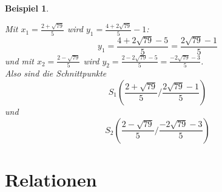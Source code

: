 \documentclass{report}
\newtheorem{myexample}{Beispiel}
\begin{document}
\begin{myexample}
\begin{enumerate}
\begin{enumerate}
Mit $x_1 = \frac{2 + \sqrt{79}}{5}$ wird $y_1 = \frac{4 + 2 \sqrt{79}}{5}-1$:
\begin{equation}y_1 = \frac{4 + 2 \sqrt{79} -5}{5} = \frac{2 \sqrt{79} -1}{5}\end{equation}
und mit $x_2 = \frac{2 - \sqrt{79}}{5}$ wird $y_2 = \frac{2-2\sqrt{79}-5}{5} = \frac{-2 \sqrt{79}-3}{5}$.\\
Also sind die Schnittpunkte
\begin{equation}S_1(\frac{2+\sqrt{79}}{5}/\frac{2 \sqrt{79}-1}{5})\end{equation}
und
\begin{equation}S_2(\frac{2-\sqrt{79}}{5}/\frac{-2 \sqrt{79}-3}{5})\end{equation}
\end{enumerate}
\end{enumerate}
\end{myexample}

\chapter{Relationen}
\end{document}
